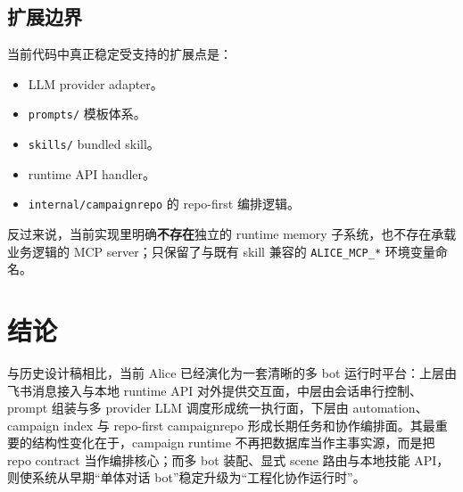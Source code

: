 \documentclass[12pt,a4paper]{ctexart}
\begin{document}
\subsection{扩展边界}

当前代码中真正稳定受支持的扩展点是：

\begin{itemize}
  \item LLM provider adapter。
  \item \texttt{prompts/} 模板体系。
  \item \texttt{skills/} bundled skill。
  \item runtime API handler。
  \item \texttt{internal/campaignrepo} 的 repo-first 编排逻辑。
\end{itemize}

反过来说，当前实现里明确\textbf{不存在}独立的 runtime memory 子系统，也不存在承载业务逻辑的 MCP server；只保留了与既有 skill 兼容的 \texttt{ALICE\_MCP\_*} 环境变量命名。

\section{结论}

与历史设计稿相比，当前 Alice 已经演化为一套清晰的多 bot 运行时平台：上层由飞书消息接入与本地 runtime API 对外提供交互面，中层由会话串行控制、prompt 组装与多 provider LLM 调度形成统一执行面，下层由 automation、campaign index 与 repo-first campaignrepo 形成长期任务和协作编排面。其最重要的结构性变化在于，campaign runtime 不再把数据库当作主事实源，而是把 repo contract 当作编排核心；而多 bot 装配、显式 scene 路由与本地技能 API，则使系统从早期“单体对话 bot”稳定升级为“工程化协作运行时”。
\end{document}

